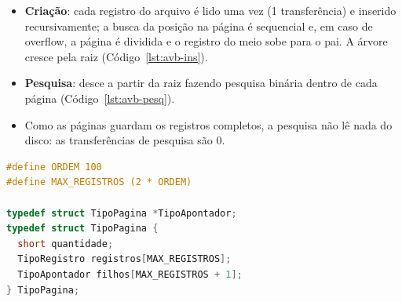 \documentclass{article}
\begin{document}
\begin{itemize}
    \item \textbf{Criação}: cada registro do arquivo é lido uma vez (1 transferência) e inserido recursivamente; a busca da posição na página é sequencial e, em caso de overflow, a página é dividida e o registro do meio sobe para o pai. A árvore cresce pela raiz (Código~\ref{lst:avb-ins}).
    \item \textbf{Pesquisa}: desce a partir da raiz fazendo pesquisa binária dentro de cada página (Código~\ref{lst:avb-pesq}).
    \item Como as páginas guardam os registros completos, a pesquisa não lê nada do disco: as transferências de pesquisa são 0.
\end{itemize}

\begin{lstlisting}[caption={Página da árvore B (avB.h).},label={lst:avb-pag},language=C]
#define ORDEM 100
#define MAX_REGISTROS (2 * ORDEM)

typedef struct TipoPagina *TipoApontador;
typedef struct TipoPagina {
  short quantidade;
  TipoRegistro registros[MAX_REGISTROS];
  TipoApontador filhos[MAX_REGISTROS + 1];
} TipoPagina;
\end{lstlisting}
\end{document}

